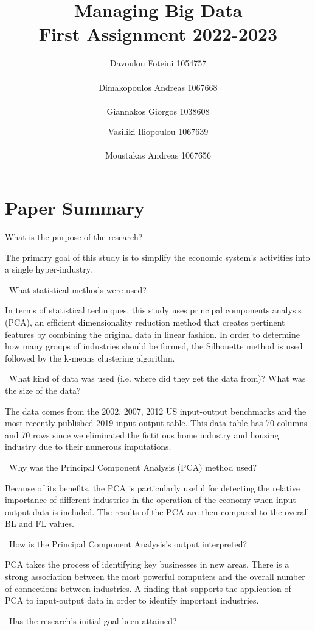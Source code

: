 \documentclass[10pt,towside,a4paper]{article}
\title{ \textbf{ Managing Big Data\\
First Assignment 2022-2023 }}
\author{Davoulou Foteini 1054757\\
	\\
	Dimakopoulos Andreas 1067668\\
	\\
	Giannakos Giorgos 1038608
	\and
	Vasiliki Iliopoulou 1067639 \\
	\\
	Moustakas Andreas 1067656\\
}
\begin{document}
	 	\maketitle	 	
	 	\tableofcontents
	 	\appendix
	 	\newpage
\section{Paper Summary}


	 	
What is the purpose of the research?
	 
	 
         The primary goal of this study is to simplify the economic system's activities into a single hyper-industry. 
	 
	 ~What statistical methods were used?
	 
	 In terms of statistical techniques, this study uses principal components analysis (PCA), an efficient dimensionality reduction method that creates pertinent features by combining the original data in linear fashion. In order to determine how many groups of industries should be formed, the Silhouette method is used followed by the k-means clustering algorithm.
	 
	 ~What kind of data was used (i.e. where did they get the data from)? What was the size of the data?
	 
	The data comes from the 2002, 2007, 2012 US input-output benchmarks and the most recently published 2019 input-output table. This data-table has 70 columns and 70 rows since we eliminated the fictitious home industry and housing industry due to their numerous imputations.
	 
	 ~Why was the Principal Component Analysis (PCA) method used?
	 
	 Because of its benefits, the PCA is particularly useful for detecting the relative importance of different industries in the operation of the economy when input-output data is included. The results of the PCA are then compared to the overall BL and FL values.
	 
	 ~How is the Principal Component Analysis's output interpreted?
	 
	 PCA takes the process of identifying key businesses in new areas. There is a strong association between the most powerful computers and the overall number of connections between industries. A finding that supports the application of PCA to input-output data in order to identify important industries.
	 
	 ~Has the research's initial goal been attained?
	 
\end{document}
